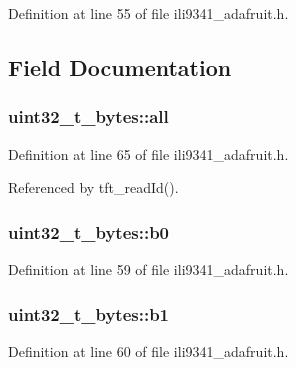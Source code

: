 Definition at line 55 of file ili9341\+\_\+adafruit.\+h.



\subsection{Field Documentation}
\subsubsection[{\texorpdfstring{all}{all}}]{ uint32\+\_\+t\+\_\+bytes\+::all}\hypertarget{unionuint32__t__bytes_a83b0c87830b60d185365dbadf8efd4a0}{}\label{unionuint32__t__bytes_a83b0c87830b60d185365dbadf8efd4a0}


Definition at line 65 of file ili9341\+\_\+adafruit.\+h.



Referenced by tft\+\_\+read\+Id().

\subsubsection[{\texorpdfstring{b0}{b0}}]{ uint32\+\_\+t\+\_\+bytes\+::b0}\hypertarget{unionuint32__t__bytes_a92b86537decb69327191d870f41c60f7}{}\label{unionuint32__t__bytes_a92b86537decb69327191d870f41c60f7}


Definition at line 59 of file ili9341\+\_\+adafruit.\+h.

\subsubsection[{\texorpdfstring{b1}{b1}}]{ uint32\+\_\+t\+\_\+bytes\+::b1}\hypertarget{unionuint32__t__bytes_a91fb31482a2ce44b454fca964dcd556b}{}\label{unionuint32__t__bytes_a91fb31482a2ce44b454fca964dcd556b}


Definition at line 60 of file ili9341\+\_\+adafruit.\+h.

